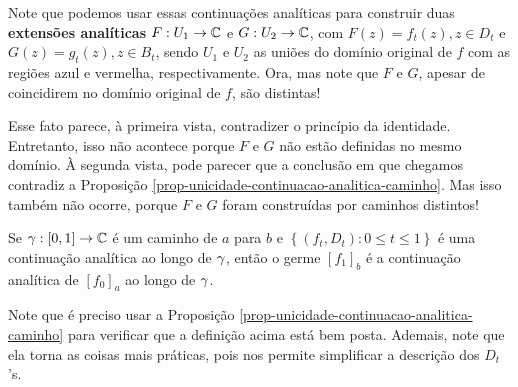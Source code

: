 \begin{observacao}
        Note que podemos usar essas continuações analíticas para construir duas
        \textbf{extensões analíticas} $F:U_1\to\mathbb{C}$ e $G:U_2\to\mathbb{C}$, 
        com $F(z) = f_t(z), z\in D_t$ e $G(z) = g_t(z), z\in B_t$, 
        sendo $U_1$ e $U_2$ as uniões do domínio original de $f$
        com as regiões azul e vermelha, respectivamente. Ora, mas note que
        $F$ e $G$, apesar de coincidirem no domínio original de $f$, são distintas!
        
        Esse fato parece, à primeira vista, contradizer o princípio da identidade. 
        Entretanto, isso não acontece porque $F$ e $G$ não estão definidas no mesmo
        domínio. À segunda vista, pode parecer que a conclusão em que chegamos contradiz
        a Proposição \ref{prop-unicidade-continuacao-analitica-caminho}. Mas isso também 
        não ocorre, porque $F$ e $G$ foram construídas por caminhos distintos!
    \end{observacao}
    \begin{definicao}
    \label{def-continuacao-analitica-germe}
        Se $\gamma: [0,1]\to\mathbb{C}$ é um caminho de $a$ para $b$ e 
        $\left\{ (f_t, D_t): 0\leq t\leq 1 \right\}$ é uma continuação analítica ao
        longo de $\gamma$, então o germe $[f_1]_b$ é a continuação analítica de
        $[f_0]_a$ ao longo de $\gamma$.
    \end{definicao}

    Note que é preciso usar a Proposição \ref{prop-unicidade-continuacao-analitica-caminho}
    para verificar que a definição acima está bem posta. Ademais, note que ela torna
    as coisas mais práticas, pois nos permite simplificar a descrição dos $D_t$'s.

